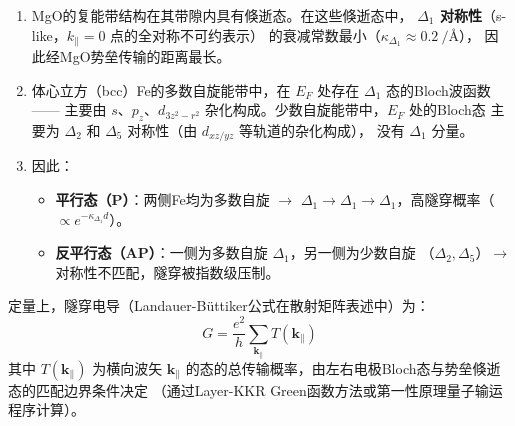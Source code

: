 \documentclass[11pt,a4paper,twoside]{article}
\theoremstyle{definition}
\theoremstyle{plain}
\theoremstyle{remark}
\begin{document}
\begin{enumerate}
  \item MgO的复能带结构在其带隙内具有倏逝态。在这些倏逝态中，
  \textbf{$\Delta_1$ 对称性}（s-like，$k_\parallel = 0$ 点的全对称不可约表示）
  的衰减常数最小（$\kappa_{\Delta_1} \approx \SI{0.2}{\per\angstrom}$），
  因此经MgO势垒传输的距离最长。

  \item 体心立方（bcc）Fe的多数自旋能带中，在 $E_F$ 处存在 $\Delta_1$ 态的Bloch波函数——
  主要由 $s$、$p_z$、$d_{3z^2-r^2}$ 杂化构成。少数自旋能带中，$E_F$ 处的Bloch态
  主要为 $\Delta_2$ 和 $\Delta_5$ 对称性（由 $d_{xz/yz}$ 等轨道的杂化构成），
  没有 $\Delta_1$ 分量。

  \item 因此：
  \begin{itemize}
    \item \textbf{平行态（P）}：两侧Fe均为多数自旋 $\rightarrow$
    $\Delta_1 \to \Delta_1 \to \Delta_1$，高隧穿概率（$\propto e^{-\kappa_{\Delta_1} d}$）。
    \item \textbf{反平行态（AP）}：一侧为多数自旋 $\Delta_1$，另一侧为少数自旋
    （$\Delta_2, \Delta_5$）$\rightarrow$ 对称性不匹配，隧穿被指数级压制。
  \end{itemize}
\end{enumerate}

定量上，隧穿电导（Landauer-B\"{u}ttiker公式在散射矩阵表述中）为：
\begin{equation}
  G = \frac{e^2}{h} \sum_{\mathbf{k}_\parallel} T(\mathbf{k}_\parallel)
\end{equation}
其中 $T(\mathbf{k}_\parallel)$ 为横向波矢 $\mathbf{k}_\parallel$
的态的总传输概率，由左右电极Bloch态与势垒倏逝态的匹配边界条件决定
（通过Layer-KKR Green函数方法或第一性原理量子输运程序计算）。
\end{document}
